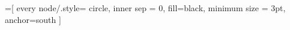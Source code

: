
\usepackage{tikz}
\usepackage{ifthen}

=[%
	every node/.style={
		circle, inner sep = 0, fill=black, minimum size = 3pt, anchor=south
	}%
]